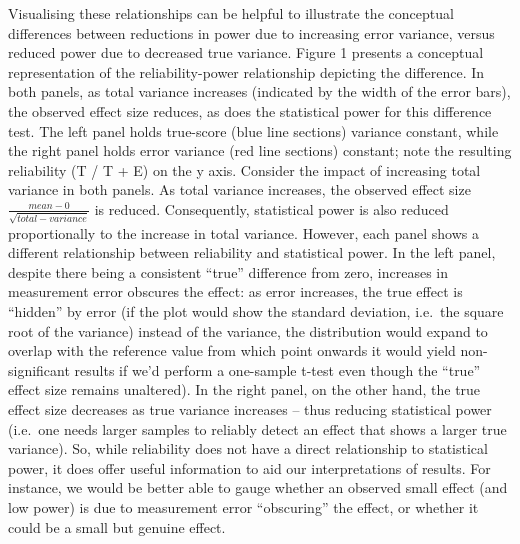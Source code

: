 \documentclass[english,,man,floatsintext]{apa6}
\begin{document}
Visualising these relationships can be helpful to illustrate the conceptual differences between reductions in power due to increasing error variance, versus reduced power due to decreased true variance. Figure 1 presents a conceptual representation of the reliability-power relationship depicting the difference. In both panels, as total variance increases (indicated by the width of the error bars), the observed effect size reduces, as does the statistical power for this difference test. The left panel holds true-score (blue line sections) variance constant, while the right panel holds error variance (red line sections) constant; note the resulting reliability (T / T + E) on the y axis. Consider the impact of increasing total variance in both panels. As total variance increases, the observed effect size \(\frac{mean - 0}{\sqrt{total-variance}}\) is reduced. Consequently, statistical power is also reduced proportionally to the increase in total variance. However, each panel shows a different relationship between reliability and statistical power. In the left panel, despite there being a consistent \enquote{true} difference from zero, increases in measurement error obscures the effect: as error increases, the true effect is \enquote{hidden} by error (if the plot would show the standard deviation, i.e.~the square root of the variance) instead of the variance, the distribution would expand to overlap with the reference value from which point onwards it would yield non-significant results if we'd perform a one-sample t-test even though the \enquote{true} effect size remains unaltered). In the right panel, on the other hand, the true effect size decreases as true variance increases -- thus reducing statistical power (i.e.~one needs larger samples to reliably detect an effect that shows a larger true variance). So, while reliability does not have a direct relationship to statistical power, it does offer useful information to aid our interpretations of results. For instance, we would be better able to gauge whether an observed small effect (and low power) is due to measurement error \enquote{obscuring} the effect, or whether it could be a small but genuine effect.
\end{document}
